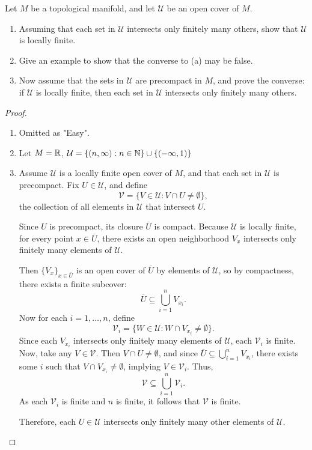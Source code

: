 \begin{problem}
  Let $M$ be a topological manifold, and let $\mathcal{U}$ be an open cover of $M$.
  \begin{enumerate}
    \item  Assuming that each set in $\mathcal{U}$ intersects only finitely many others, show
    that $\mathcal{U}$ is locally finite.
    \item Give an example to show that the converse to (a) may be false.
    \item Now assume that the sets in $\mathcal{U}$ are precompact in $M$, and prove the converse: if $\mathcal{U}$ is locally finite, then each set in $\mathcal{U}$ intersects only finitely many others.
  \end{enumerate}
  \begin{proof}
    \begin{enumerate}
      \item Omitted as "Easy".
      \item Let $M=\mathbb{R}$, $\mathcal{U} = \{(n, \infty):n \in \mathbb{N}\} \cup \{(-\infty, 1)\}$
\item Assume $\mathcal{U}$ is a locally finite open cover of $M$, and that each set in $\mathcal{U}$ is precompact. Fix $U \in \mathcal{U}$, and define
\[
\mathcal{V} = \{V \in \mathcal{U} \colon V \cap U \neq \emptyset\},
\]
the collection of all elements in $\mathcal{U}$ that intersect $U$.

Since $U$ is precompact, its closure $\overline{U}$ is compact. Because $\mathcal{U}$ is locally finite, for every point $x \in \overline{U}$, there exists an open neighborhood  $V_x$ intersects only finitely many elements of $\mathcal{U}$.

Then $\{V_x\}_{x \in \overline{U}}$ is an open cover of $\overline{U}$ by elements of $\mathcal{U}$, so by compactness, there exists a finite subcover:
\[
\overline{U} \subseteq \bigcup_{i=1}^n V_{x_i}.
\]
Now for each $i = 1, \dots, n$, define
\[
\mathcal{V}_i = \{W \in \mathcal{U} \colon W \cap V_{x_i} \neq \emptyset\}.
\]
Since each $V_{x_i}$ intersects only finitely many elements of $\mathcal{U}$, each $\mathcal{V}_i$ is finite.
Now, take any $V \in \mathcal{V}$. Then $V \cap U \neq \emptyset$, and since $\overline{U} \subseteq \bigcup_{i=1}^n V_{x_i}$, there exists some $i$ such that $V \cap V_{x_i} \neq \emptyset$, implying $V \in \mathcal{V}_i$. Thus,
\[
\mathcal{V} \subseteq \bigcup_{i=1}^n \mathcal{V}_i.
\]
As each $\mathcal{V}_i$ is finite and $n$ is finite, it follows that $\mathcal{V}$ is finite.

Therefore, each $U \in \mathcal{U}$ intersects only finitely many other elements of $\mathcal{U}$.
    \end{enumerate}
  \end{proof}
\end{problem}

